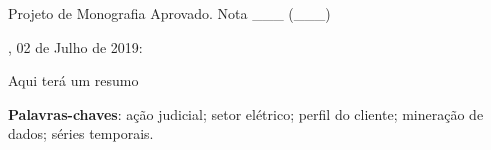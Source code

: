 \documentclass[
	12pt,				%
	openany,
	oneside,
	a4paper,			%
	english,			%
	french,				%
	spanish,			%
	brazil,				%
	]{abntex2}
\begin{document}
\frenchspacing 


\imprimircapa

\imprimirfolhaderosto

\begin{folhadeaprovacao}

  \begin{center}
    {\ABNTEXchapterfont\large\imprimirautor}

    \vspace*{\fill}\vspace*{\fill}
    \begin{center}
      \ABNTEXchapterfont\bfseries\Large\imprimirtitulo
    \end{center}
    \vspace*{\fill}
    
    \hspace{.45\textwidth}
    \begin{minipage}{.5\textwidth}
        \imprimirpreambulo
    \end{minipage}%
    \vspace*{\fill}
   \end{center}
        
   Projeto de Monografia Aprovado. Nota \_\_\_ (\_\_\_) \par \imprimirlocal, 02 de Julho de 2019:

      
   \begin{center}
    \vspace*{0.5cm}
    {\large\imprimirlocal}
    \par
    {\large\imprimirdata}
    \vspace*{1cm}
  \end{center}
  
\end{folhadeaprovacao}


\setlength{\absparsep}{18pt} %

\begin{resumo}

Aqui terá um resumo

 \noindent
\textbf{Palavras-chaves}: ação judicial; setor elétrico; perfil do cliente; mineração de dados; séries temporais.

\end{resumo}
\end{document}
